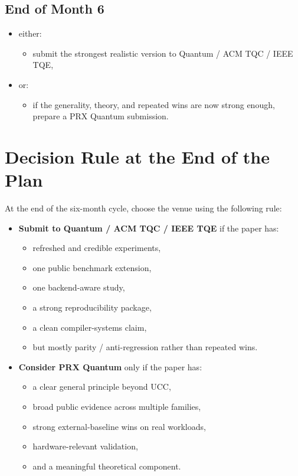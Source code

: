 \documentclass[11pt]{article}
\begin{document}
\subsection*{End of Month 6}
\begin{itemize}
    \item either:
    \begin{itemize}
        \item submit the strongest realistic version to Quantum / ACM TQC / IEEE TQE,
    \end{itemize}
    \item or:
    \begin{itemize}
        \item if the generality, theory, and repeated wins are now strong enough, prepare a PRX Quantum submission.
    \end{itemize}
\end{itemize}

\section{Decision Rule at the End of the Plan}

\noindent
At the end of the six-month cycle, choose the venue using the following rule:

\begin{itemize}
    \item \textbf{Submit to Quantum / ACM TQC / IEEE TQE} if the paper has:
    \begin{itemize}
        \item refreshed and credible experiments,
        \item one public benchmark extension,
        \item one backend-aware study,
        \item a strong reproducibility package,
        \item a clean compiler-systems claim,
        \item but mostly parity / anti-regression rather than repeated wins.
    \end{itemize}

    \item \textbf{Consider PRX Quantum} only if the paper has:
    \begin{itemize}
        \item a clear general principle beyond UCC,
        \item broad public evidence across multiple families,
        \item strong external-baseline wins on real workloads,
        \item hardware-relevant validation,
        \item and a meaningful theoretical component.
    \end{itemize}
\end{itemize}
\end{document}
